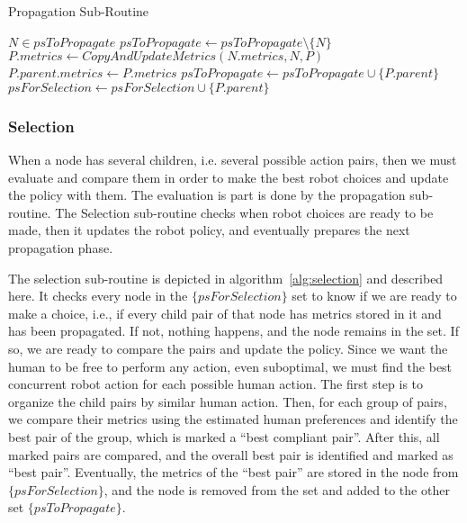 \begin{algorithm}
\caption{Propagation Sub-Routine}\label{alg:propagation}
\begin{algorithmic}[1]

    \State $N \in psToPropagate$
    \State $psToPropagate \gets psToPropagate \setminus \{N\}$
        \State $P.metrics \gets CopyAndUpdateMetrics(N.metrics, N, P)$
            \State $P.parent.metrics \gets P.metrics$
            \State $psToPropagate \gets psToPropagate \cup \{P.parent\}$
        \Else
            \State $psForSelection \gets psForSelection \cup \{P.parent\}$
        \EndIf
    \EndFor
\EndWhile

\end{algorithmic}
\end{algorithm}



    \subsubsection{Selection}

When a node has several children, i.e. several possible action pairs, then we must evaluate and compare them in order to make the best robot choices and update the policy with them. The evaluation is part is done by the propagation sub-routine. The Selection sub-routine checks when robot choices are ready to be made, then it updates the robot policy, and eventually prepares the next propagation phase. 

The selection sub-routine is depicted in algorithm~\ref{alg:selection} and described here. It checks every node in the $\{psForSelection\}$ set to know if we are ready to make a choice, i.e., if every child pair of that node has metrics stored in it and has been propagated. 
If not, nothing happens, and the node remains in the set.
If so, we are ready to compare the pairs and update the policy. Since we want the human to be free to perform any action, even suboptimal, we must find the best concurrent robot action for each possible human action. The first step is to organize the child pairs by similar human action. Then, for each group of pairs, we compare their metrics using the estimated human preferences and identify the best pair of the group, which is marked a ``best compliant pair''. After this, all marked pairs are compared, and the overall best pair is identified and marked as ``best pair''. Eventually, the metrics of the ``best pair'' are stored in the node from $\{psForSelection\}$, and the node is removed from the set and added to the other set $\{psToPropagate\}$.

